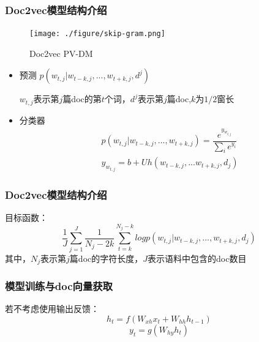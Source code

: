 \documentclass[notheorems]{beamer}
\begin{document}
\begin{frame}
\frametitle{Doc2vec模型结构介绍}
     
 \begin{minipage}[t]{0.4\linewidth}
 \centering
     \begin{figure}
      \scalebox{0.25}
      {
        \texttt{[image: ./figure/skip-gram.png]}
      }
      \caption{Doc2vec PV-DM}
    \end{figure}
 \end{minipage}%
\begin{minipage}[t]{0.6\linewidth}
\centering
\begin{itemize}
\item 预测
$p(w_{t,j}|w_{t-k,j},...,w_{t+k,j},d^{j})$\\
\begin{footnotesize}
$w_{t,j}$表示第$j$篇doc的第$t$个词，$d^{j}$表示第$j$篇doc,$k$为$1/2$窗长\\
\end{footnotesize}
\item 分类器
\begin{equation}
\begin{aligned}
& p(w_{t,j}|w_{t-k,j},...,w_{t+k,j})=\dfrac{e^{y_{w_{t,j}}}}{\sum_{i}e^{y_{i}}}\\
& y_{w_{t,j}}=b + Uh(w_{t-k,j},...w_{t+k,j},d_{j})
\end{aligned}
\end{equation}
\end{itemize}

\end{minipage}     
\end{frame}


\begin{frame}
\frametitle{Doc2vec模型结构介绍}
\begin{flushleft}
目标函数：
\begin{equation}
\frac{1}{J}\sum_{j=1}^{J}\frac{1}{N_{j}-2k}\sum_{t=k}^{N_{j}-k}logp(w_{t,j}|w_{t-k,j},...,w_{t+k,j},d_{j})
\end{equation}
其中，$N_{j}$表示第$j$篇doc的字符长度，$J$表示语料中包含的doc数目
\end{flushleft}
\end{frame}



\begin{frame}
\frametitle{模型训练与doc向量获取}
若不考虑使用输出反馈：
\begin{equation}
h_{t}=f(W_{xh}x_t+W_{hh}h_{t-1})
\end{equation}
\begin{equation}
y_{t}=g(W_{hy}h_{t})
\end{equation}

\end{frame}
\end{document}
